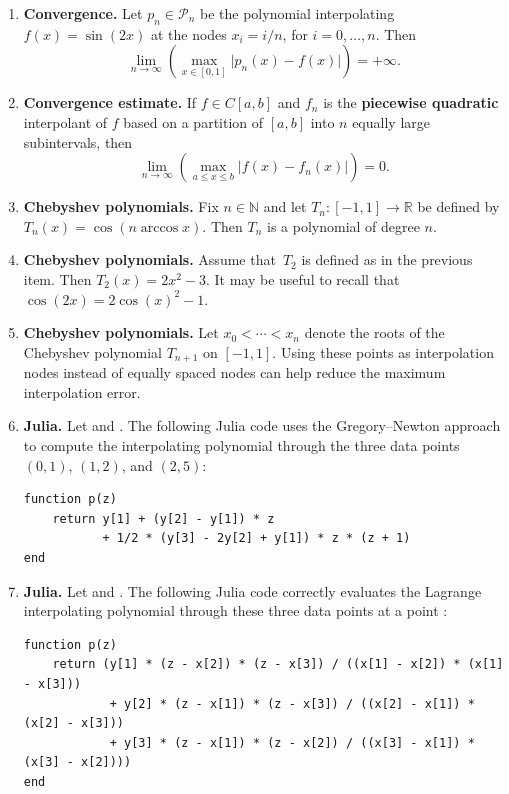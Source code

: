 \documentclass[a4paper]{article}
\begin{document}
\begin{enumerate}
    \item
        \textbf{Convergence.}
        Let $p_n \in \mathcal P_n$ be the polynomial interpolating
        $f(x)=\sin(2x)$ at the nodes $x_i=i/n$, for $i=0,\dotsc,n$. Then
        \[
            \lim_{n\to\infty} \left( \max_{x\in[0,1]} \bigl\lvert p_n(x)-f(x)\bigr\rvert \right) = + \infty.
        \]

    \item
        \textbf{Convergence estimate.}
        If $f\in C[a,b]$ and $f_n$ is the \textbf{piecewise quadratic} interpolant of $f$ based on a partition of $[a,b]$ into $n$ 
        equally large subintervals, then
        \[
            \lim_{n\to\infty}\left( \max_{a\leq x\leq b}\bigl\lvert f(x)-f_n(x)\bigr\rvert \right)=0.
        \]

    \item
        \textbf{Chebyshev polynomials.}
        Fix $n \in \mathbb N$ and let $T_n \colon[-1,1]\to\mathbb R$ be defined by $T_n(x) = \cos(n \arccos x)$.
        Then $T_n$ is a polynomial of degree $n$.

    \item
        \textbf{Chebyshev polynomials.}
        Assume that~$T_2$ is defined as in the previous item.
        Then $T_2(x) = 2x^2 - 3$.
        It may be useful to recall that~$\cos(2x) = 2\cos(x)^2 - 1$.

    \item
        \textbf{Chebyshev polynomials.}
        Let $x_0 < \dotsb < x_n$ denote the roots of the Chebyshev polynomial $T_{n+1}$ on $[-1,1]$.
        Using these points as interpolation nodes instead of equally spaced nodes can help reduce the maximum interpolation error.



    \item
        \textbf{Julia.}
        Let  and . The following Julia code uses
        the Gregory--Newton approach to compute the interpolating polynomial through the three data
        points $(0,1)$, $(1,2)$, and $(2,5)$:
        \begin{verbatim}
function p(z)
    return y[1] + (y[2] - y[1]) * z
           + 1/2 * (y[3] - 2y[2] + y[1]) * z * (z + 1)
end
        \end{verbatim}

    \item
        \textbf{Julia.}
        Let  and . The following
        Julia code correctly evaluates the Lagrange interpolating polynomial through these three
        data points at a point :
        \begin{verbatim}
function p(z)
    return (y[1] * (z - x[2]) * (z - x[3]) / ((x[1] - x[2]) * (x[1] - x[3]))
            + y[2] * (z - x[1]) * (z - x[3]) / ((x[2] - x[1]) * (x[2] - x[3]))
            + y[3] * (z - x[1]) * (z - x[2]) / ((x[3] - x[1]) * (x[3] - x[2])))
end
        \end{verbatim}


\end{enumerate}
\end{document}
